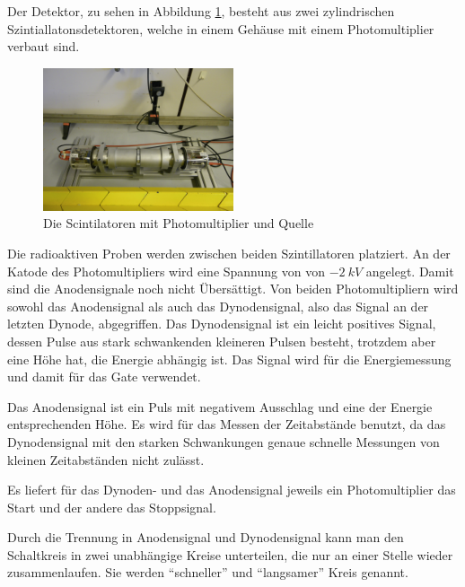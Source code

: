 \documentclass[a4paper,12pt]{article}
\begin{document}
Der Detektor, zu sehen in Abbildung \ref{fig:quelle},  besteht aus zwei zylindrischen Szintiallatonsdetektoren,
 welche in einem Gehäuse mit einem Photomultiplier verbaut sind.
\begin{figure}[htb]
		\centering
		\includegraphics[width=0.5\textwidth]{quelle2.jpg}
		\caption{Die Scintilatoren mit Photomultiplier und Quelle}
		\label{fig:quelle}
\end{figure}

Die radioaktiven Proben werden zwischen beiden Szintillatoren platziert.
An der Katode des Photomultipliers wird  eine Spannung von von $\SI{-2}{kV}$ angelegt.
Damit sind die Anodensignale noch nicht Übersättigt.
Von beiden Photomultipliern wird sowohl das Anodensignal als auch das Dynodensignal, also das Signal an der letzten Dynode, abgegriffen.
Das Dynodensignal ist ein leicht positives Signal, dessen Pulse aus stark schwankenden kleineren Pulsen besteht, trotzdem aber eine Höhe hat, die Energie abhängig ist.
Das Signal wird für die Energiemessung und damit für das Gate verwendet.

Das Anodensignal ist ein Puls mit negativem Ausschlag und eine der Energie entsprechenden Höhe.
Es wird für das Messen der Zeitabstände benutzt, da das Dynodensignal mit den starken Schwankungen genaue schnelle Messungen von kleinen Zeitabständen nicht zulässt.

Es liefert für das Dynoden- und das Anodensignal jeweils ein Photomultiplier das Start und der andere das Stoppsignal.

Durch die Trennung in Anodensignal und Dynodensignal kann man den Schaltkreis in zwei unabhängige Kreise unterteilen, die nur an einer Stelle wieder zusammenlaufen.
Sie werden "`schneller"' und "`langsamer"' Kreis genannt.
\end{document}
